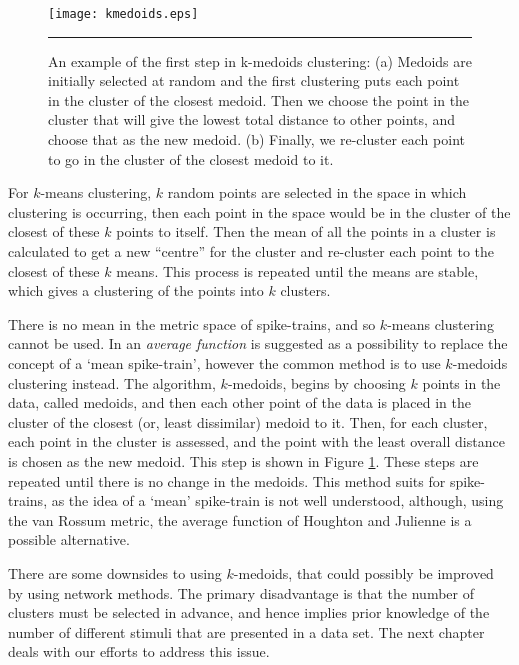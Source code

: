 \begin{figure}[htb]
  \centering
  \texttt{[image: kmedoids.eps]}
  \bigskip
  \rule{35em}{0.5pt}
  \caption{An example of the first step in k-medoids clustering:  (a) Medoids 
    are initially selected at random and the first clustering puts each point 
    in the cluster of the closest medoid. Then we choose the point in the 
    cluster that will give the lowest total distance to other points, and 
    choose that as the new medoid. (b) Finally, we re-cluster each point to go 
    in the cluster of the closest medoid to it.  \label{kmed}}
\end{figure}


For $k$-means clustering, $k$ random points are selected in the space in which 
clustering is occurring, then each point in the space would be in the cluster of 
the closest of these $k$ points to itself.  Then the mean of all 
the points in a cluster is calculated to get a new ``centre'' for the cluster and re-cluster 
each point to the closest of these $k$ means.  This process is repeated until 
the means are stable, which gives a clustering of the points into $k$ clusters.

There is no mean in the metric space of spike-trains, and so  
$k$-means clustering cannot be used.  In \citep{JulienneHoughton2012a} an \emph{average function} is suggested as a possibility to replace the concept of a `mean spike-train', however  the common method is to use $k$-medoids clustering instead.  The algorithm, 
$k$-medoids, begins by choosing $k$ points in the data, called medoids, 
and then  each other point of the data is placed in the cluster of the 
closest (or, least dissimilar) medoid to it.  Then, for each cluster, 
 each point in the cluster is assessed, and the point with 
the least overall distance is chosen as the new medoid. This step is shown in Figure 
\ref{kmed}. These steps are repeated until there is no change in the 
medoids.  This method suits for spike-trains, as the idea of a `mean'
spike-train is not well understood, although, using the van Rossum metric, the average function of Houghton and Julienne is a possible alternative.

There are some downsides to using $k$-medoids, that could possibly be 
improved by using network methods.  The primary disadvantage is that the number of 
 clusters must be selected in advance, and hence implies prior knowledge of the number of different 
stimuli that are presented in a data set.  The next chapter deals with our 
efforts to address this issue.

